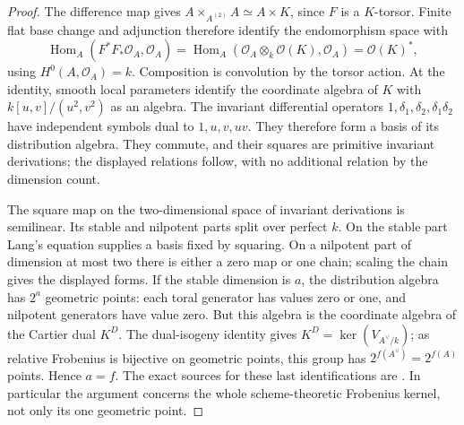 \begin{proof}
The difference map gives
$A\times_{A^{(2)}}A\simeq A\times K$, since $F$ is a $K$-torsor.
Finite flat base change and adjunction therefore identify the
endomorphism space with
\[
 \operatorname{Hom}_A(F^*F_*\mathcal O_A,\mathcal O_A)
 =\operatorname{Hom}_A(\mathcal O_A\otimes_k\mathcal O(K),\mathcal O_A)
 =\mathcal O(K)^*,
\]
using $H^0(A,\mathcal O_A)=k$. Composition is convolution by the
torsor action. At the identity, smooth local parameters identify the
coordinate algebra of $K$ with $k[u,v]/(u^2,v^2)$ as an algebra.
The invariant differential operators $1,\delta_1,\delta_2,
\delta_1\delta_2$ have independent symbols dual to
$1,u,v,uv$. They therefore form a basis of its distribution algebra.
They commute, and their squares are primitive invariant derivations;
the displayed relations follow, with no additional relation by the
dimension count.

The square map on the two-dimensional space of invariant derivations
is semilinear. Its stable and nilpotent parts split over perfect $k$.
On the stable part Lang's equation supplies a basis fixed by squaring.
On a nilpotent part of dimension at most two there is either a zero
map or one chain; scaling the chain gives the displayed forms.
If the stable dimension is $a$, the distribution algebra has $2^a$
geometric points: each toral generator has values zero or one, and
nilpotent generators have value zero. But this algebra is the
coordinate algebra of the Cartier dual $K^D$.
The dual-isogeny identity gives
$K^D=\ker(V_{A^\vee/k})$; as relative Frobenius is bijective on
geometric points, this group has $2^{f(A^\vee)}=2^{f(A)}$ points.
Hence $a=f$.
The exact sources for these last identifications are
\citet[Theorem~7.5, p.~100; Proposition~7.34 and proof, p.~111;
Proposition~5.22 and proof, pp.~80--81]{EdixhovenVanDerGeerMoonenAV}.
In particular the argument concerns the whole scheme-theoretic
Frobenius kernel, not only its one geometric point.
\end{proof}

